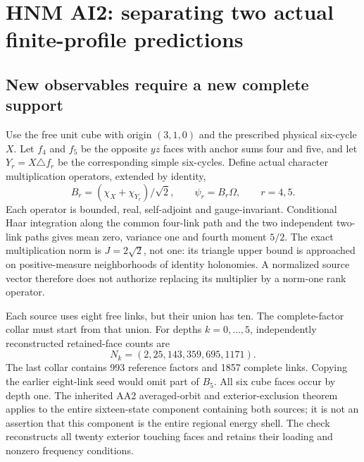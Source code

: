 \section{HNM AI2: separating two actual finite-profile predictions\workstar}
\subsection{New observables require a new complete support}
Use the free unit cube with origin $(3,1,0)$ and the prescribed physical six-cycle $X$. Let $f_4$ and $f_5$ be the opposite $yz$ faces with anchor sums four and five, and let $Y_r=X\triangle f_r$ be the corresponding simple six-cycles. Define actual character multiplication operators, extended by identity,
\begin{equation}
B_r=(\chi_X+\chi_{Y_r})/\sqrt2,\qquad \psi_r=B_r\Omega,\qquad r=4,5.
\label{r27:eq:probes}
\end{equation}
Each operator is bounded, real, self-adjoint and gauge-invariant. Conditional Haar integration along the common four-link path and the two independent two-link paths gives mean zero, variance one and fourth moment $5/2$. The exact multiplication norm is $J=2\sqrt2$, not one: its triangle upper bound is approached on positive-measure neighborhoods of identity holonomies. A normalized source vector therefore does not authorize replacing its multiplier by a norm-one rank operator.

Each source uses eight free links, but their union has ten. The complete-factor collar must start from that union. For depths $k=0,\ldots,5$, independently reconstructed retained-face counts are
\begin{equation}
N_k=(2,25,143,359,695,1171).
\label{r27:eq:collars}
\end{equation}
The last collar contains 993 reference factors and 1857 complete links. Copying the earlier eight-link seed would omit part of $B_5$. All six cube faces occur by depth one. The inherited AA2 averaged-orbit and exterior-exclusion theorem applies to the entire sixteen-state component containing both sources; it is not an assertion that this component is the entire regional energy shell. The check reconstructs all twenty exterior touching faces and retains their loading and nonzero frequency conditions.

